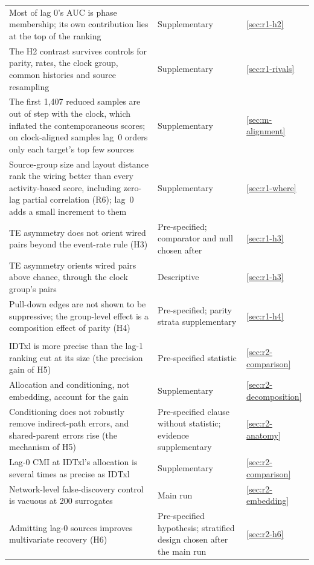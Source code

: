 {\begin{longtable}{@{}L{0.55\textwidth}L{0.28\textwidth}l@{}}
    Most of lag 0's AUC is phase membership; its own contribution lies at the top of the ranking & Supplementary & \ref{sec:r1-h2} \\
    The H2 contrast survives controls for parity, rates, the clock group, common histories and source resampling & Supplementary & \ref{sec:r1-rivals} \\
    The first 1,407 reduced samples are out of step with the clock, which inflated the contemporaneous scores; on clock-aligned samples lag~0 orders only each target's top few sources & Supplementary & \ref{sec:m-alignment} \\
    Source-group size and layout distance rank the wiring better than every activity-based score, including zero-lag partial correlation (R6); lag~0 adds a small increment to them & Supplementary & \ref{sec:r1-where} \\
    TE asymmetry does not orient wired pairs beyond the event-rate rule (H3) & Pre-specified; comparator and null chosen after & \ref{sec:r1-h3} \\
    TE asymmetry orients wired pairs above chance, through the clock group's pairs & Descriptive & \ref{sec:r1-h3} \\
    Pull-down edges are not shown to be suppressive; the group-level effect is a composition effect of parity (H4) & Pre-specified; parity strata supplementary & \ref{sec:r1-h4} \\
    \addlinespace
     \\
    IDTxl is more precise than the lag-1 ranking cut at its size (the precision gain of H5) & Pre-specified statistic & \ref{sec:r2-comparison} \\
    Allocation and conditioning, not embedding, account for the gain & Supplementary & \ref{sec:r2-decomposition} \\
    Conditioning does not robustly remove indirect-path errors, and shared-parent errors rise (the mechanism of H5) & Pre-specified clause without statistic; evidence supplementary & \ref{sec:r2-anatomy} \\
    Lag-0 CMI at IDTxl's allocation is several times as precise as IDTxl & Supplementary & \ref{sec:r2-comparison} \\
    Network-level false-discovery control is vacuous at 200 surrogates & Main run & \ref{sec:r2-embedding} \\
    Admitting lag-0 sources improves multivariate recovery (H6) & Pre-specified hypothesis; stratified design chosen after the main run & \ref{sec:r2-h6} \\

\end{longtable}}
